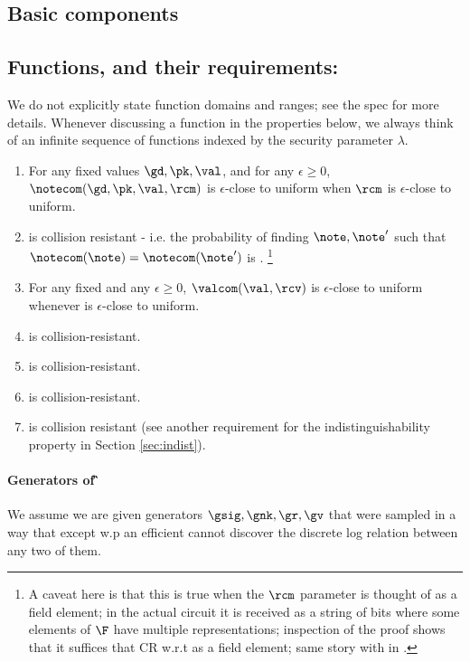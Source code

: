 \documentclass[11pt]{article}
\numberwithin{equation}{section} %
\numberwithin{figure}{section} %
\newcommand{\eps}{\ensuremath{\epsilon}\xspace}
\begin{document}
 \subsection{Basic components}
\subsection*{Functions, and their requirements:}
We do not explicitly state function domains and ranges; see the spec for more details.
Whenever discussing a function in the properties below, we always think of an infinite sequence of functions indexed by the security parameter $\lambda$.
\begin{enumerate}
 \item For any fixed values $\gd,\pk,\val$, and for any $\eps\geq 0$, $\notecom(\gd,\pk,\val,\rcm)$ is $\eps$-close to uniform when $\rcm$ is $\eps$-close to uniform.
 \item \notecom is collision resistant - i.e. the probability of finding $\note,\note'$ such that $\notecom(\note)=\notecom(\note')$ is \negl. \footnote{A caveat here is that this is true when the $\rcm$ parameter is thought of as a field element; in the actual circuit it is received as a string of bits where some elements of $\F$ have multiple representations; inspection of the proof shows that it suffices that CR w.r.t \rcm as a field element; same story with \rcv in \valcom.}
\item For any fixed \val and any $\eps\geq 0$, $\valcom(\val,\rcv)$ is $\eps$-close to uniform whenever \rcv is $\eps$-close to uniform. 
\item \valcom is collision-resistant.
\item \sighash is collision-resistant.
\item \IVK is collision-resistant.
\item \NF is collision resistant
(see another requirement for the indistinguishability property in Section \ref{sec:indist}).
\end{enumerate}

\paragraph{Generators of \G}
We assume we are given generators $\gsig,\gnk,\gr,\gv$ that were sampled in a way that except w.p \negl
an efficient \adv cannot discover the discrete log relation between any two of them.
\end{document}
